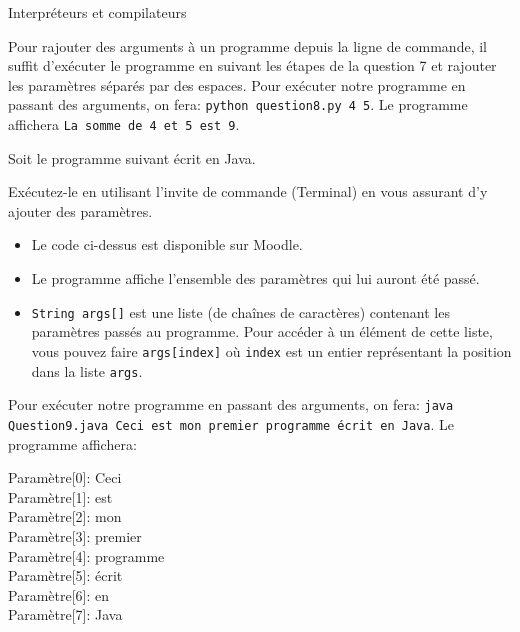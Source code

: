\begin{section}{Interpréteurs et compilateurs}
\begin{Exercice}[10 minutes]
        \begin{solution}
            Pour rajouter des arguments à un programme depuis la ligne de commande, il suffit d'exécuter le programme en suivant les étapes de la question 7 et rajouter les paramètres séparés par des espaces. Pour exécuter notre programme en passant des arguments, on fera: \lstinline{python question8.py 4 5}. Le programme affichera \lstinline{La somme de 4 et 5 est 9}.
        \end{solution}

    \end{Exercice}

    \begin{Exercice}[10 minutes]
        Soit le programme suivant écrit en Java. 

        
        
        Exécutez-le en utilisant l'invite de commande (Terminal) en vous assurant d'y ajouter des paramètres.
    

        \begin{conseil}
            \begin{itemize}
                \item Le code ci-dessus est disponible sur Moodle.
                \item Le programme affiche l'ensemble des paramètres qui lui auront été passé.
                \item \lstinline{String args[]} est une liste (de chaînes de caractères) contenant les paramètres passés au programme. Pour accéder à un élément de cette liste, vous pouvez faire \lstinline{args[index]} où \lstinline{index} est un entier représentant la position dans la liste \lstinline{args}.
            \end{itemize}
        \end{conseil}
        \begin{solution}
            Pour exécuter notre programme en passant des arguments, on fera: \lstinline{java Question9.java Ceci est mon premier programme écrit en Java}. Le programme affichera:\\
            \parbox{\textwidth}{
                Paramètre[0]: Ceci\\
                Paramètre[1]: est\\
                Paramètre[2]: mon\\
                Paramètre[3]: premier\\
                Paramètre[4]: programme\\
                Paramètre[5]: écrit\\
                Paramètre[6]: en\\
                Paramètre[7]: Java
            }

        \end{solution}

    \end{Exercice}
    
\end{section}
